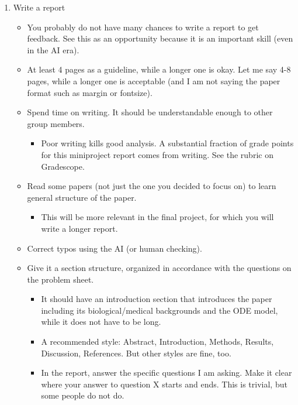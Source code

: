 \documentclass[20pt]{extarticle}
\begin{document}
\begin{enumerate}
\begin{itemize}
		\begin{itemize}
		\item I think ``don't use AI'' instruction makes much sense.
		\item I care about your learning and growth more than detecting AI cheating.
		\end{itemize}
	\end{itemize}
\item Write a report
	\begin{itemize}
	\item You probably do not have many chances to write a report to get feedback. See this as an opportunity because it is an important skill (even in the AI era).
	\item At least 4 pages as a guideline, while a longer one is okay. Let me say 4-8 pages, while a longer one is acceptable (and I am not saying the paper format such as margin or fontsize).
	\item Spend time on writing. It should be understandable enough to other group members.
		\begin{itemize}
		\item Poor writing kills good analysis. A substantial fraction of grade points for this miniproject report comes from writing. See the rubric on Gradescope.
		\end{itemize}
	\item Read some papers (not just the one you decided to focus on) to learn general structure of the paper.
		\begin{itemize}
		\item This will be more relevant in the final project, for which you will write a longer report.
		\end{itemize}
	\item Correct typos using the AI (or human checking).
	\item Give it a section structure, organized in accordance with the questions on the problem sheet.
		\begin{itemize}
		\item It should have an introduction section that introduces the paper including its biological/medical backgrounds and the ODE model, while it does not have to be long.
		\item A recommended style: Abstract, Introduction, Methods, Results, Discussion, References. But other styles are fine, too.
		\item In the report, answer the specific questions I am asking. Make it clear where your answer to question X starts and ends. This is trivial, but some people do not do.

\end{itemize}
\end{itemize}
\end{enumerate}
\end{document}

